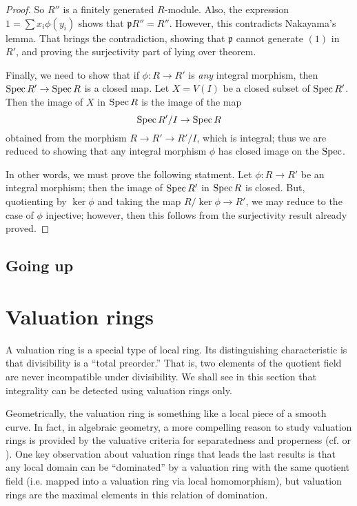 \begin{proof}
So $R''$ is a finitely generated $R$-module. Also, the expression
$1 = \sum x_i \phi(y_i)$ shows that $\mathfrak{p}R'' = R''$. However, this
contradicts Nakayama's lemma. That brings the contradiction, showing that
$\mathfrak{p}$ cannot generate $(1)$ in $R'$, and proving the surjectivity
part of  lying over theorem.

Finally, we need to show that if $\phi: R \to R'$ is \emph{any} integral
morphism, then $\operatorname{Spec} R' \to \operatorname{Spec} R$ is a closed map. Let $X = V(I) $ be a
closed subset of $\operatorname{Spec} R'$. Then the image of $X$ in $\operatorname{Spec} R$ is the image
of the map
\[ \operatorname{Spec} R'/I \to \operatorname{Spec} R   \]
obtained from the morphism $R \to R' \to  R'/I$, which is integral; thus we are
reduced to showing that any integral morphism $\phi$ has closed image on the
$\operatorname{Spec}$. 


In other words, we must prove the following statment. Let $\phi: R \to R'$ be
an integral morphism; then the image of $\operatorname{Spec} R'$ in $\operatorname{Spec} R$ is closed.
But, quotienting by $\ker \phi$ and taking the map $R/\ker \phi \to R'$, we
may reduce to the case of $\phi$ injective; however, then this follows from
the surjectivity result already proved.
\end{proof}

\subsection{Going up}




\section{Valuation rings}

A valuation ring is a special type of local ring. Its distinguishing
characteristic is that divisibility is a ``total preorder.'' That is, two
elements of the quotient field are never incompatible under divisibility.
 We shall see in this section that integrality can be detected using
valuation rings only.

Geometrically, the valuation ring is something like a local piece of a smooth
curve. In fact, in algebraic geometry, a more compelling reason to study
valuation rings is provided by the valuative criteria for separatedness and
properness (cf. \cite{EGA} or \cite{Ha77}).  One key observation about
valuation rings that leads the last results is that any local domain can be
``dominated'' by a valuation ring with the same quotient field (i.e. mapped
into a valuation ring via local
homomorphism), but valuation rings are the maximal elements in this relation
of domination.

